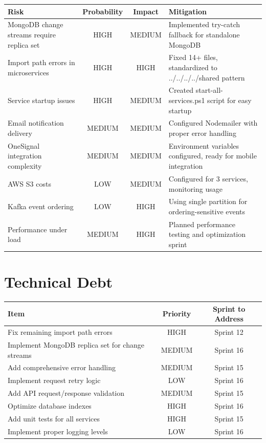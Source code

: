 \documentclass[11pt,a4paper]{article}
\begin{document}
\begin{longtable}{|p{4cm}|c|c|p{6cm}|}
\hline
\textbf{Risk} & \textbf{Probability} & \textbf{Impact} & \textbf{Mitigation} \\
\hline
MongoDB change streams require replica set & HIGH & MEDIUM & Implemented try-catch fallback for standalone MongoDB \\
\hline
Import path errors in microservices & HIGH & HIGH & Fixed 14+ files, standardized to ../../../../shared pattern \\
\hline
Service startup issues & HIGH & MEDIUM & Created start-all-services.ps1 script for easy startup \\
\hline
Email notification delivery & MEDIUM & MEDIUM & Configured Nodemailer with proper error handling \\
\hline
OneSignal integration complexity & MEDIUM & MEDIUM & Environment variables configured, ready for mobile integration \\
\hline
AWS S3 costs & LOW & MEDIUM & Configured for 3 services, monitoring usage \\
\hline
Kafka event ordering & LOW & HIGH & Using single partition for ordering-sensitive events \\
\hline
Performance under load & MEDIUM & HIGH & Planned performance testing and optimization sprint \\
\hline
\end{longtable}

\section{Technical Debt}

\begin{longtable}{|p{6cm}|c|c|}
\hline
\textbf{Item} & \textbf{Priority} & \textbf{Sprint to Address} \\
\hline
Fix remaining import path errors & HIGH & Sprint 12 \\
Implement MongoDB replica set for change streams & MEDIUM & Sprint 16 \\
Add comprehensive error handling & MEDIUM & Sprint 15 \\
Implement request retry logic & LOW & Sprint 16 \\
Add API request/response validation & MEDIUM & Sprint 15 \\
Optimize database indexes & HIGH & Sprint 16 \\
Add unit tests for all services & HIGH & Sprint 15 \\
Implement proper logging levels & LOW & Sprint 16 \\
\hline
\end{longtable}
\end{document}
